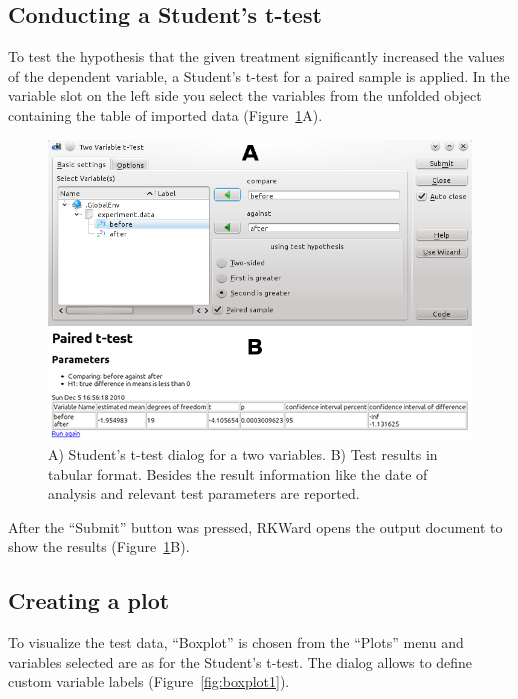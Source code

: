 \subsection{Conducting a Student's t-test}
\label{sec:conducting_ttest}
To test the hypothesis that the given treatment significantly increased
the values of the dependent variable, a Student's
t-test for a paired sample is applied. In the variable slot on the left
side you select the variables from the unfolded
 object containing the table of imported data (Figure~\ref{fig:t_test}A).

\begin{figure}[htp]
 \centering
 \includegraphics[width=15.5cm]{../figures/t-test.png}
 \caption{A) Student's t-test dialog for a two variables. B) Test results in tabular  format. 
Besides the result information like the date of analysis and relevant test parameters are reported.}
 \label{fig:t_test}
\end{figure}

After the ``Submit'' button was pressed, RKWard opens the output document
to show the results (Figure~\ref{fig:t_test}B).

\subsection{Creating a plot}
\label{sec:create_plot}
To visualize the test data, ``Boxplot'' is chosen from the ``Plots'' menu
and variables selected are as for the Student's t-test.
The dialog allows to define custom variable labels (Figure~\ref{fig:boxplot1}).

